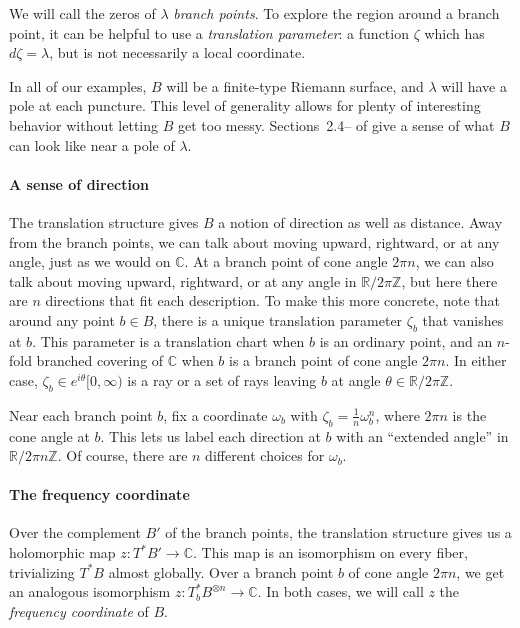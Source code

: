 \documentclass{article}
\newcommand{\maps}{\colon}
\newcommand{\Z}{\mathbb{Z}}
\newcommand{\R}{\mathbb{R}}
\newcommand{\C}{\mathbb{C}}
\theoremstyle{definition}
\theoremstyle{plain}
\begin{document}
We will call the zeros of $\lambda$ {\em branch points}. To explore the region around a branch point, it can be helpful to use a {\em translation parameter}: a function $\zeta$ which has $d\zeta = \lambda$, but is not necessarily a local coordinate.

In all of our examples, $B$ will be a finite-type Riemann surface, and $\lambda$ will have a pole at each puncture. This level of generality allows for plenty of interesting behavior without letting $B$ get too messy. Sections~2.4\;-- of \cite{gupta2013meromorphic} give a sense of what $B$ can look like near a pole of $\lambda$.
%
\paragraph{A sense of direction}
%
The translation structure gives $B$ a notion of direction as well as distance. Away from the branch points, we can talk about moving upward, rightward, or at any angle, just as we would on $\C$. At a branch point of cone angle $2\pi n$, we can also talk about moving upward, rightward, or at any angle in $\R/2\pi\Z$, but here there are $n$ directions that fit each description. To make this more concrete, note that around any point $b \in B$, there is a unique translation parameter $\zeta_b$ that vanishes at $b$. This parameter is a translation chart when $b$ is an ordinary point, and an $n$-fold branched covering of $\C$ when $b$ is a branch point of cone angle $2\pi n$. In either case, $\zeta_b \in e^{i\theta} [0, \infty)$ is a ray or a set of rays leaving $b$ at angle $\theta \in \R/2\pi\Z$.

Near each branch point $b$, fix a coordinate $\omega_b$ with $\zeta_b = \tfrac{1}{n} \omega_b^n$, where $2\pi n$ is the cone angle at $b$. This lets us label each direction at $b$ with an ``extended angle'' in $\R/2\pi n\Z$. Of course, there are $n$ different choices for $\omega_b$.
%
\paragraph{The frequency coordinate}\label{transl-freq}
%
Over the complement $B'$ of the branch points, the translation structure gives us a holomorphic map $z \maps T^*B' \to \C$. This map is an isomorphism on every fiber, trivializing $T^*B$ almost globally. Over a branch point $b$ of cone angle $2\pi n$, we get an analogous isomorphism $z \maps T^*_bB^{\otimes n} \to \C$. In both cases, we will call $z$ the {\em frequency coordinate} of $B$.
\begin{center}
\phaseSpaceLaplace
{}
\end{center}
\end{document}
